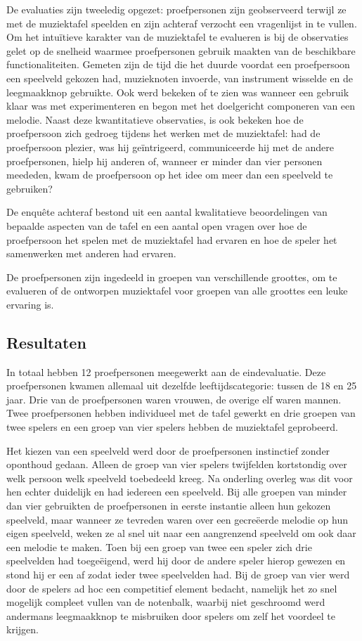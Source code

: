 \documentclass{acm}
\begin{document}
De evaluaties zijn tweeledig opgezet: proefpersonen zijn geobserveerd terwijl ze met de muziektafel speelden en zijn achteraf verzocht een vragenlijst in te vullen. Om het intuïtieve karakter van de muziektafel te evalueren is bij de observaties gelet op de snelheid waarmee proefpersonen gebruik maakten van de beschikbare functionaliteiten. Gemeten zijn de tijd die het duurde voordat een proefpersoon een speelveld gekozen had, muzieknoten invoerde, van instrument wisselde en de leegmaakknop gebruikte. Ook werd bekeken of te zien was wanneer een gebruik klaar was met experimenteren en begon met het doelgericht componeren van een melodie. Naast deze kwantitatieve observaties, is ook bekeken hoe de proefpersoon zich gedroeg tijdens het werken met de muziektafel: had de proefpersoon plezier, was hij geïntrigeerd, communiceerde hij met de andere proefpersonen, hielp hij anderen of, wanneer er minder dan vier personen meededen, kwam de proefpersoon op het idee om meer dan een speelveld te gebruiken?

De enquête achteraf bestond uit een aantal kwalitatieve beoordelingen van bepaalde aspecten van de tafel en een aantal open vragen over hoe de proefpersoon het spelen met de muziektafel had ervaren en hoe de speler het samenwerken met anderen had ervaren.

De proefpersonen zijn ingedeeld in groepen van verschillende groottes, om te evalueren of de ontworpen muziektafel voor groepen van alle groottes een leuke ervaring is.

\subsection{Resultaten}
In totaal hebben 12 proefpersonen meegewerkt aan de eindevaluatie. Deze proefpersonen kwamen allemaal uit dezelfde leeftijdscategorie: tussen de 18 en 25 jaar. Drie van de proefpersonen waren vrouwen, de overige elf waren mannen. Twee proefpersonen hebben individueel met de tafel gewerkt en drie groepen van twee spelers en een groep van vier spelers hebben de muziektafel geprobeerd.

Het kiezen van een speelveld werd door de proefpersonen instinctief zonder oponthoud gedaan. Alleen de groep van vier spelers twijfelden kortstondig over welk persoon welk speelveld toebedeeld kreeg. Na onderling overleg was dit voor hen echter duidelijk en had iedereen een speelveld. Bij alle groepen van minder dan vier gebruikten de proefpersonen in eerste instantie alleen hun gekozen speelveld, maar wanneer ze tevreden waren over een gecreëerde melodie op hun eigen speelveld, weken ze al snel uit naar een aangrenzend speelveld om ook daar een melodie te maken. Toen bij een groep van twee een speler zich drie speelvelden had toegeëigend, werd hij door de andere speler hierop gewezen en stond hij er een af zodat ieder twee speelvelden had. Bij de groep van vier werd door de spelers ad hoc een competitief element bedacht, namelijk het zo snel mogelijk compleet vullen van de notenbalk, waarbij niet geschroomd werd andermans leegmaakknop te misbruiken door spelers om zelf het voordeel te krijgen.
\end{document}
